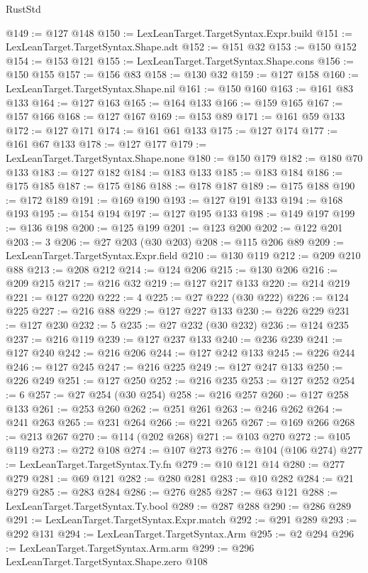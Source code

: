 \begin{lexlean}{RustStd}
\begin{coremodule}
@149 := @127 @148
@150 := LexLeanTarget.TargetSyntax.Expr.build
@151 := LexLeanTarget.TargetSyntax.Shape.adt
@152 := @151 @32
@153 := @150 @152
@154 := @153 @121
@155 := LexLeanTarget.TargetSyntax.Shape.cons
@156 := @150 @155
@157 := @156 @83
@158 := @130 @32
@159 := @127 @158
@160 := LexLeanTarget.TargetSyntax.Shape.nil
@161 := @150 @160
@163 := @161 @83 @133
@164 := @127 @163
@165 := @164 @133
@166 := @159 @165
@167 := @157 @166
@168 := @127 @167
@169 := @153 @89
@171 := @161 @59 @133
@172 := @127 @171
@174 := @161 @61 @133
@175 := @127 @174
@177 := @161 @67 @133
@178 := @127 @177
@179 := LexLeanTarget.TargetSyntax.Shape.none
@180 := @150 @179
@182 := @180 @70 @133
@183 := @127 @182
@184 := @183 @133
@185 := @183 @184
@186 := @175 @185
@187 := @175 @186
@188 := @178 @187
@189 := @175 @188
@190 := @172 @189
@191 := @169 @190
@193 := @127 @191 @133
@194 := @168 @193
@195 := @154 @194
@197 := @127 @195 @133
@198 := @149 @197
@199 := @136 @198
@200 := @125 @199
@201 := @123 @200
@202 := @122 @201
@203 := 3
@206 := @27 @203 (@30 @203)
@208 := @115 @206 @89
@209 := LexLeanTarget.TargetSyntax.Expr.field
@210 := @130 @119
@212 := @209 @210 @88
@213 := @208 @212
@214 := @124 @206
@215 := @130 @206
@216 := @209 @215
@217 := @216 @32
@219 := @127 @217 @133
@220 := @214 @219
@221 := @127 @220
@222 := 4
@225 := @27 @222 (@30 @222)
@226 := @124 @225
@227 := @216 @88
@229 := @127 @227 @133
@230 := @226 @229
@231 := @127 @230
@232 := 5
@235 := @27 @232 (@30 @232)
@236 := @124 @235
@237 := @216 @119
@239 := @127 @237 @133
@240 := @236 @239
@241 := @127 @240
@242 := @216 @206
@244 := @127 @242 @133
@245 := @226 @244
@246 := @127 @245
@247 := @216 @225
@249 := @127 @247 @133
@250 := @226 @249
@251 := @127 @250
@252 := @216 @235
@253 := @127 @252
@254 := 6
@257 := @27 @254 (@30 @254)
@258 := @216 @257
@260 := @127 @258 @133
@261 := @253 @260
@262 := @251 @261
@263 := @246 @262
@264 := @241 @263
@265 := @231 @264
@266 := @221 @265
@267 := @169 @266
@268 := @213 @267
@270 := @114 (@202 @268)
@271 := @103 @270
@272 := @105 @119
@273 := @272 @108
@274 := @107 @273
@276 := @104 (@106 @274)
@277 := LexLeanTarget.TargetSyntax.Ty.fn
@279 := @10 @121 @14
@280 := @277 @279
@281 := @69 @121
@282 := @280 @281
@283 := @10 @282
@284 := @21 @279
@285 := @283 @284
@286 := @276 @285
@287 := @63 @121
@288 := LexLeanTarget.TargetSyntax.Ty.bool
@289 := @287 @288
@290 := @286 @289
@291 := LexLeanTarget.TargetSyntax.Expr.match
@292 := @291 @289
@293 := @292 @131
@294 := LexLeanTarget.TargetSyntax.Arm
@295 := @2 @294
@296 := LexLeanTarget.TargetSyntax.Arm.arm
@299 := @296 LexLeanTarget.TargetSyntax.Shape.zero @108

\end{coremodule}
\end{lexlean}
